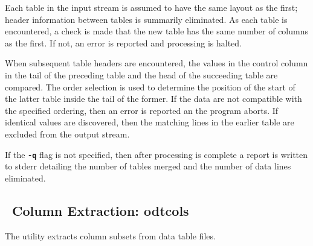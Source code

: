 Each table in the input stream is assumed to have the same layout as
the first; header information between tables is summarily eliminated.
As each table is encountered, a check is made that the new table has
the same number of columns as the first.  If not, an error is reported
and processing is halted.

When subsequent table headers are encountered, the values in the
control column in the tail of the preceding table and the head of the
succeeding table are compared.  The order selection is used to
determine the position of the start of the latter table inside the
tail of the former.  If the data are not compatible with the specified
ordering, then an error is reported an the program aborts.  If
identical values are discovered, then the matching lines in the
earlier table are excluded from the output stream.

If the \texttt{\textbf{-q}} flag is not specified, then after
processing is complete a report is written to stderr detailing the
number of tables merged and the number of data lines eliminated.


\subsection{\ODT\ Column Extraction: odtcols}\label{sec:odtcols}%

The  utility extracts column
subsets from  data
table files.

